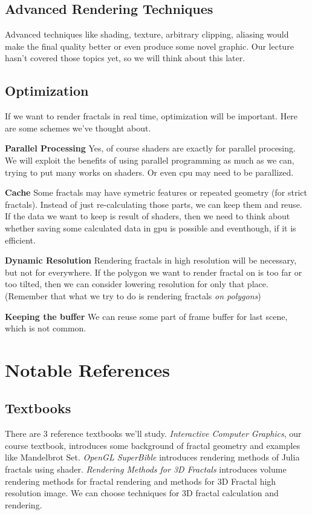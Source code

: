 \documentclass[a4paper]{article}
\begin{document}
\subsection{Advanced Rendering Techniques}
Advanced techniques like shading, texture, arbitrary clipping, aliasing would make the final quality better or even produce some novel graphic.
Our lecture hasn't covered those topics yet, so we will think about this later.

\subsection{Optimization}
If we want to render fractals in real time, optimization will be important.
Here are some schemes we've thought about.

\textbf{Parallel Processing}
Yes, of course shaders are exactly for parallel procesing.
We will exploit the benefits of using parallel programming as much as we can, trying to put many works on shaders.
Or even cpu may need to be parallized.

\textbf{Cache}
Some fractals may have symetric features or repeated geometry (for strict fractals).
Instead of just re-calculating those parts, we can keep them and reuse.
If the data we want to keep is result of shaders, then we need to think about whether saving some calculated data in gpu is possible and eventhough, if it is efficient.

\textbf{Dynamic Resolution}
Rendering fractals in high resolution will be necessary, but not for everywhere.
If the polygon we want to render fractal on is too far or too tilted, then we can consider lowering resolution for only that place.
(Remember that what we try to do is rendering fractals \textit{on polygons})

\textbf{Keeping the buffer}
We can reuse some part of frame buffer for last scene, which is not common.


\section{Notable References}
\subsection{Textbooks}
There are 3 reference textbooks we'll study.
\textit{Interactive Computer Graphics}\cite{c1}, our course textbook, introduces some background of fractal geometry and examples like Mandelbrot Set.
\textit{OpenGL SuperBible}\cite{c2} introduces rendering methods of Julia fractals using shader.
\textit{Rendering Methods for 3D Fractals}\cite{c3} introduces volume rendering methods for fractal rendering and methods for 3D Fractal high resolution image. We can choose techniques for 3D fractal calculation and rendering.
\end{document}
